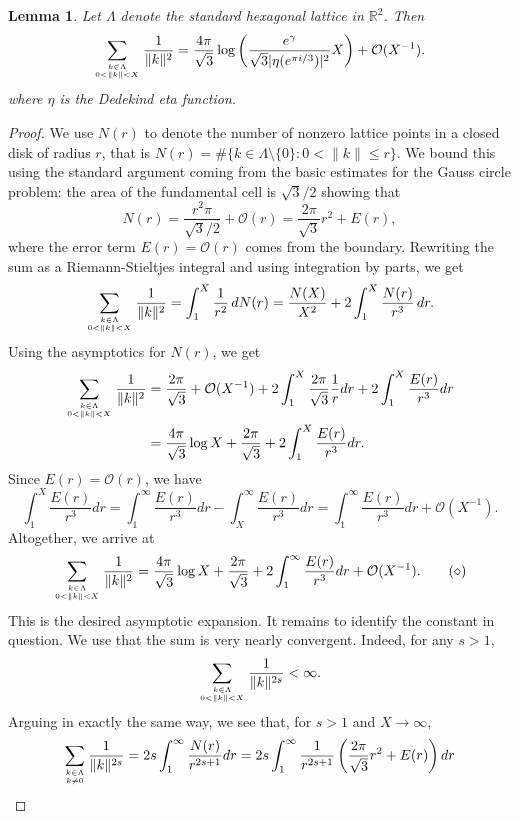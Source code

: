 \documentclass[10pt, reqno]{amsart}
\newtheorem{lemma}{Lemma}
\begin{document}
\begin{lemma} Let $\Lambda$ denote the standard hexagonal lattice in $\mathbb{R}^2$. Then
$$ \sum_{k \in \Lambda \atop 0 < \|k\| < X} \frac{1}{\|k\|^2} = \frac{4\pi}{\sqrt{3}} \log\left( \frac{e^{\gamma}}{\sqrt{3} |\eta(e^{\pi i/3})|^2}X \right) + \mathcal{O}(X^{-1}).$$
where $\eta$ is the Dedekind eta function.
\end{lemma}
\begin{proof}
We use $N(r)$ to denote the number of nonzero lattice points in a closed disk of radius $r$, that is $N(r) = \#\{k \in \Lambda \setminus \{0\} : 0< \|k\| \le r\}.$
We bound this using the standard argument coming from the basic estimates for the Gauss circle problem: the area of the fundamental cell is $\sqrt{3}/2$ showing that
$$ N(r) = \frac{r^2 \pi}{\sqrt{3}/2} + \mathcal{O}(r) = \frac{2 \pi}{\sqrt{3}} r^2 + E(r),$$
where the error term $E(r) = \mathcal{O}(r)$ comes from the boundary. Rewriting the sum as a Riemann-Stieltjes integral and using integration by parts, we get
$$ \sum_{k \in \Lambda \atop 0 < \|k\| < X} \frac{1}{\|k\|^2} = \int_{1}^X \frac{1}{r^2} \, dN(r) = \frac{N(X)}{X^2} + 2 \int_1^X \frac{N(r)}{r^3} \, dr.$$
Using the asymptotics for $N(r)$, we get
\begin{align*}
\sum_{k \in \Lambda \atop 0 < \|k\| < X} \frac{1}{\|k\|^2} &= \frac{2 \pi}{\sqrt{3}} + \mathcal{O}(X^{-1}) + 2 \int_1^X \frac{2 \pi}{\sqrt{3}} \frac{1}{r}dr + 2\int_1^X \frac{E(r)}{r^3} dr \\
&= \frac{4 \pi}{\sqrt{3}} \log{X} + \frac{2\pi}{\sqrt{3}} + 2\int_1^X \frac{E(r)}{r^3} dr.
\end{align*}
  Since $E(r) = \mathcal{O}(r)$, we have
  $$  \int_1^X \frac{E(r)}{r^3} dr =  \int_1^{\infty} \frac{E(r)}{r^3} dr -  \int_X^{\infty} \frac{E(r)}{r^3} dr =   \int_1^{\infty} \frac{E(r)}{r^3} dr  + \mathcal{O}(X^{-1}).$$
Altogether, we arrive at
$$ \sum_{k \in \Lambda \atop 0 < \|k\| < X} \frac{1}{\|k\|^2} = \frac{4 \pi}{\sqrt{3}} \log{X} + \frac{2\pi}{\sqrt{3}} + 2\int_1^{\infty} \frac{E(r)}{r^3} dr + \mathcal{O}(X^{-1}). \qquad (\diamond)$$
This is the desired asymptotic expansion.  It remains to identify the constant in question.
We use that the sum is very nearly convergent. Indeed, for any $s > 1$,
$$ \sum_{k \in \Lambda \atop 0 < \|k\| < X} \frac{1}{\|k\|^{2s}} < \infty.$$
Arguing in exactly the same way, we see that, for $s>1$ and $X \rightarrow \infty$,
\begin{align*}
 \sum_{k \in \Lambda \atop k \neq 0} \frac{1}{\|k\|^{2s}} &=  2s \int_1^{\infty} \frac{N(r)}{r^{2s+1}} dr = 2s \int_1^{\infty} \frac{1}{r^{2s+1}}\left( \frac{2 \pi}{\sqrt{3}} r^2 + E(r) \right) dr \\

\end{align*}
\end{proof}
\end{document}
